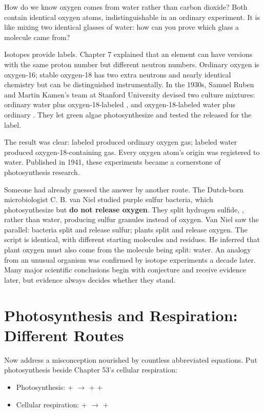 \begin{zhengju}
How do we know oxygen comes from water rather than carbon dioxide? Both contain identical oxygen atoms, indistinguishable in an ordinary experiment. It is like mixing two identical glasses of water: how can you prove which glass a molecule came from?

Isotopes provide labels. Chapter 7 explained that an element can have versions with the same proton number but different neutron numbers. Ordinary oxygen is oxygen-16; stable oxygen-18 has two extra neutrons and nearly identical chemistry but can be distinguished instrumentally. In the 1930s, Samuel Ruben and Martin Kamen's team at Stanford University devised two culture mixtures: ordinary water plus oxygen-18-labeled , and oxygen-18-labeled water plus ordinary . They let green algae photosynthesize and tested the released  for the label.

The result was clear: labeled  produced ordinary oxygen gas; labeled water produced oxygen-18-containing gas. Every oxygen atom's origin was registered to water. Published in 1941, these experiments became a cornerstone of photosynthesis research.

Someone had already guessed the answer by another route. The Dutch-born microbiologist C. B. van Niel studied purple sulfur bacteria, which photosynthesize but \textbf{do not release oxygen}. They split hydrogen sulfide, , rather than water, producing sulfur granules instead of oxygen. Van Niel saw the parallel: bacteria split  and release sulfur; plants split  and release oxygen. The script is identical, with different starting molecules and residues. He inferred that plant oxygen must also come from the molecule being split: water. An analogy from an unusual organism was confirmed by isotope experiments a decade later. Many major scientific conclusions begin with conjecture and receive evidence later, but evidence always decides whether they stand.
\end{zhengju}

\section{Photosynthesis and Respiration: Different Routes}

Now address a misconception nourished by countless abbreviated equations. Put photosynthesis beside Chapter 53's cellular respiration:

\begin{itemize}[itemsep=2pt]
\item Photosynthesis:  +  $\rightarrow$  +  + 
\item Cellular respiration:  +  $\rightarrow$  + 
\end{itemize}

